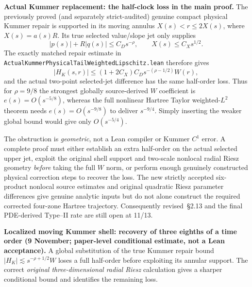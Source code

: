 \documentclass[11pt]{amsart}
\begin{document}
\medskip
\noindent\textbf{Actual Kummer replacement: the half-clock loss in the main proof.}
The previously proved (and separately strict-audited) genuine compact
physical Kummer repair is supported in its moving annulus
$X(s)<r\le 2X(s)$, where $X(s)=a(s)R$.
Its true selected value/slope jet only supplies
\[
 |p(s)|+R|q(s)|\le C_Ds^{-\rho},
 \qquad X(s)\le C_Xs^{1/2}.
\]
The exactly matched repair estimate in
\texttt{ActualKummerPhysicalTailWeightedLipschitz.lean}
therefore gives
\[
 |H_K(s,r)|
 \le (1+2C_X)C_D
 s^{-(\rho-1/2)}W(r),
\]
and the actual two-point selected-jet difference has the same
half-order loss. Thus for $\rho=9/8$ the strongest globally
source-derived $W$ coefficient is $e(s)=O(s^{-5/8})$,
whereas the full nonlinear Hartree Taylor weighted-$L^2$
theorem needs $e(s)=O(s^{-9/8})$ to deliver
$s^{-9/4}$. Simply inserting the weaker global bound
would give only $O(s^{-5/4})$.

The obstruction is \emph{geometric}, not a Lean compiler
or Kummer $C^1$ error. A complete proof must either establish
an extra half-order on the actual selected upper jet, exploit the
original shell support and two-scale nonlocal radial Riesz geometry
\emph{before} taking the full $W$ norm, or perform enough
genuinely constructed physical correction steps to recover the loss.
The new strictly accepted six-product nonlocal source estimates
and original quadratic Riesz parameter differences give genuine
analytic inputs but do not alone construct the required corrected
four-zone Hartree trajectory. Consequently revised~\S2.13 and the
final PDE-derived Type--II rate are still open at 11/13.



\medskip
\noindent\textbf{Localized moving Kummer shell: recovery of three eighths of a time order (9 November; paper-level conditional estimate, not a Lean acceptance).}
A global substitution of the true Kummer repair bound
$|H_K|\lesssim s^{-\rho+1/2}W$ loses a full half-order
before exploiting its annular support.  The correct \emph{original
three-dimensional radial Riesz} calculation gives a sharper
conditional bound and identifies the remaining loss.
\end{document}

